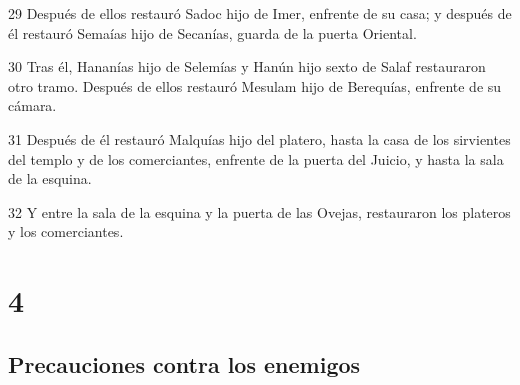 \par 29 Después de ellos restauró Sadoc hijo de Imer, enfrente de su casa; y después de él restauró Semaías hijo de Secanías, guarda de la puerta Oriental.
\par 30 Tras él, Hananías hijo de Selemías y Hanún hijo sexto de Salaf restauraron otro tramo. Después de ellos restauró Mesulam hijo de Berequías, enfrente de su cámara.
\par 31 Después de él restauró Malquías hijo del platero, hasta la casa de los sirvientes del templo y de los comerciantes, enfrente de la puerta del Juicio, y hasta la sala de la esquina.
\par 32 Y entre la sala de la esquina y la puerta de las Ovejas, restauraron los plateros y los comerciantes.

\chapter{4}

\section*{Precauciones contra los enemigos}

